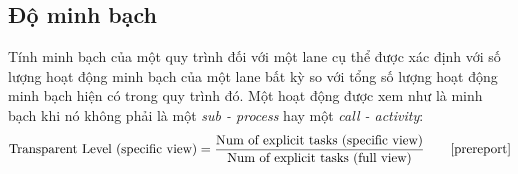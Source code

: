 \subsection{Độ minh bạch}
Tính minh bạch của một quy trình đối với một lane cụ thể được xác định với số lượng hoạt động minh bạch của một lane bất kỳ so với tổng số lượng hoạt động minh bạch hiện có trong quy trình đó. Một hoạt động được xem như là minh bạch khi nó không phải là một \emph{sub - process} hay một \emph{call - activity}:
\[ \text{Transparent Level (specific view)}  = \frac{\text{Num of explicit tasks (specific view)} }{\text{Num of explicit tasks (full view)}} \tag*{\cite{prereport}}\]
